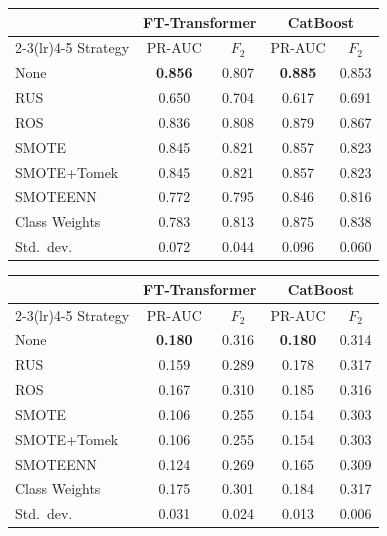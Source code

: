 \documentclass[a4paper,fleqn]{cas-sc}
\begin{document}
\noindent\begin{minipage}{\linewidth}\centering
{}
\label{tab:robustness_ulb}
\begin{tabular}{l cc cc}
\toprule
& \multicolumn{2}{c}{FT-Transformer} & \multicolumn{2}{c}{CatBoost} \\
\cmidrule(lr){2-3}\cmidrule(lr){4-5}
Strategy & PR-AUC & $F_2$ & PR-AUC & $F_2$ \\
\midrule
None        & \textbf{0.856} & 0.807 & \textbf{0.885} & 0.853 \\
RUS         & 0.650 & 0.704 & 0.617 & 0.691 \\
ROS         & 0.836 & 0.808 & 0.879 & 0.867 \\
SMOTE       & 0.845 & 0.821 & 0.857 & 0.823 \\
SMOTE+Tomek & 0.845 & 0.821 & 0.857 & 0.823 \\
SMOTEENN    & 0.772 & 0.795 & 0.846 & 0.816 \\
Class Weights & 0.783 & 0.813 & 0.875 & 0.838 \\
\midrule
Std.\ dev. & 0.072 & 0.044 & 0.096 & 0.060 \\
\bottomrule
\end{tabular}
\end{minipage}

\noindent\begin{minipage}{\linewidth}\centering
{}
\label{tab:robustness_baf}
\begin{tabular}{l cc cc}
\toprule
& \multicolumn{2}{c}{FT-Transformer} & \multicolumn{2}{c}{CatBoost} \\
\cmidrule(lr){2-3}\cmidrule(lr){4-5}
Strategy & PR-AUC & $F_2$ & PR-AUC & $F_2$ \\
\midrule
None        & \textbf{0.180} & 0.316 & \textbf{0.180} & 0.314 \\
RUS         & 0.159 & 0.289 & 0.178 & 0.317 \\
ROS         & 0.167 & 0.310 & 0.185 & 0.316 \\
SMOTE       & 0.106 & 0.255 & 0.154 & 0.303 \\
SMOTE+Tomek & 0.106 & 0.255 & 0.154 & 0.303 \\
SMOTEENN    & 0.124 & 0.269 & 0.165 & 0.309 \\
Class Weights & 0.175 & 0.301 & 0.184 & 0.317 \\
\midrule
Std.\ dev. & 0.031 & 0.024 & 0.013 & 0.006 \\
\bottomrule
\end{tabular}
\end{minipage}
\end{document}
